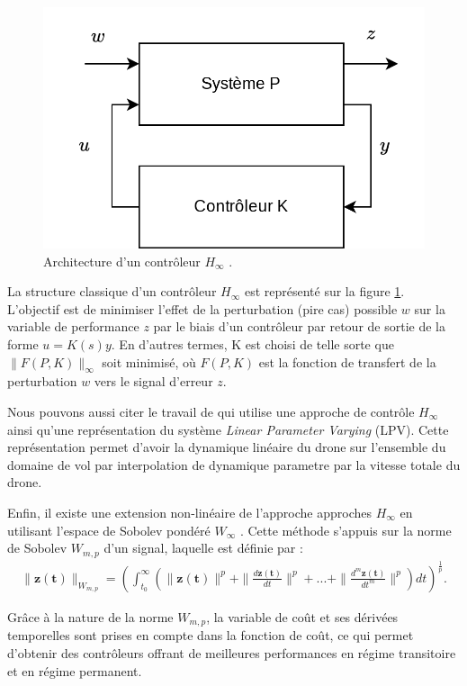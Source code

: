 \begin{figure}[ht!]
    \centerline{
    \includegraphics[trim=0cm 0cm 0cm 0cm,clip,width=0.5\columnwidth]{figures/lft.png}}
    \caption{Architecture d'un contrôleur $H_{\infty}$ .}
    \label{fig:schemalft}
\end{figure}

La structure classique d'un contrôleur $H_{\infty}$ est représenté sur la figure \ref{fig:schemalft}. L'objectif est de minimiser l'effet de la perturbation (pire cas) possible $w$ sur la variable de performance $z$ par le biais d'un contrôleur par retour de sortie de la forme $u = K(s) y$. En d'autres termes, K est choisi de telle sorte que $\| F(P, K)\|_{\infty}$  soit minimisé, où $F(P, K)$ est la fonction de transfert de la perturbation $w$ vers le signal d'erreur $z$. 

Nous pouvons aussi citer le travail de \cite{SNYDER2021106621} qui utilise une approche de contrôle $H_{\infty}$ ainsi qu'une représentation du système \textit{Linear Parameter Varying} (LPV). Cette représentation permet d'avoir la dynamique linéaire du drone sur l'ensemble du domaine de vol par interpolation de dynamique parametre par la vitesse totale du drone.

Enfin, il existe une extension non-linéaire de l'approche approches $H_{\infty}$ en utilisant l'espace de Sobolev pondéré $W_{\infty}$ \cite{cardoso2018nonlinear, CardosoEsteban2019, cardoso2021robust, cardoso2024robust}. Cette méthode s'appuis sur la norme de Sobolev $W_{m,p}$  d'un signal, laquelle est définie par :
\begin{align*}
    \|\boldsymbol{z(t)}\|_{W_{m,p}} = \left( \int_{t_{0}}^{\infty}(\|\boldsymbol{z(t)}\|^{p} + \|\frac{d \boldsymbol{z(t)}}{dt}\|^{p} + ... + \|\frac{d^{m} \boldsymbol{z(t)}}{dt^{m}}\|^{p}) dt \right)^{\frac{1}{p}}.
\end{align*}  

Grâce à la nature de la norme $W_{m,p}$, la variable de coût et ses dérivées temporelles sont prises en compte dans la fonction de coût, ce qui permet d'obtenir des contrôleurs offrant de meilleures performances en régime transitoire et en régime permanent.

